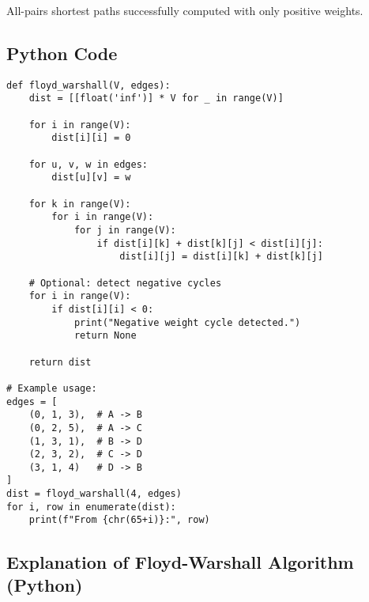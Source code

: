 \documentclass[14pt,a4paper]{extarticle}
\begin{document}
\begin{tcolorbox}[colback=white, colframe=black, title=Final Result (Positive Edges)]
All-pairs shortest paths successfully computed with only positive weights.
\end{tcolorbox}

\newpage
\subsection{Python Code}
\begin{lstlisting}[style=python, caption={Floyd-Warshall Algorithm in Python}]
def floyd_warshall(V, edges):
    dist = [[float('inf')] * V for _ in range(V)]

    for i in range(V):
        dist[i][i] = 0

    for u, v, w in edges:
        dist[u][v] = w

    for k in range(V):
        for i in range(V):
            for j in range(V):
                if dist[i][k] + dist[k][j] < dist[i][j]:
                    dist[i][j] = dist[i][k] + dist[k][j]

    # Optional: detect negative cycles
    for i in range(V):
        if dist[i][i] < 0:
            print("Negative weight cycle detected.")
            return None

    return dist

# Example usage:
edges = [
    (0, 1, 3),  # A -> B
    (0, 2, 5),  # A -> C
    (1, 3, 1),  # B -> D
    (2, 3, 2),  # C -> D
    (3, 1, 4)   # D -> B
]
dist = floyd_warshall(4, edges)
for i, row in enumerate(dist):
    print(f"From {chr(65+i)}:", row)
\end{lstlisting}

\newpage
\subsection{Explanation of Floyd-Warshall Algorithm (Python)}
\end{document}
